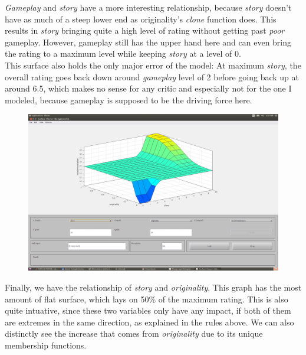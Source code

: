 \documentclass[a4paper, 11pt]{article}
\begin{document}
\textit{Gameplay} and \textit{story} have a more interesting relationship, because \textit{story} doesn't have as much of a steep lower end as originality's \textit{clone} function does. This results in \textit{story} bringing quite a high level of rating without getting past \textit{poor} gameplay. However, gameplay still has the upper hand here and can even bring the rating to a maximum level while keeping \textit{story} at a level of 0.\\ This surface also holds the only major error of the model: At maximum \textit{story}, the overall rating goes back down around \textit{gameplay} level of 2 before going back up at around 6.5, which makes no sense for any critic and especially not for the one I modeled, because gameplay is supposed to be the driving force here.

\newpage

\begin{figure}[ht]
\includegraphics[scale=0.15]{vg-surface-s-o.jpg}
\end{figure}

Finally, we have the relationship of \textit{story} and \textit{originality}. This graph has the most amount of flat surface, which lays on 50\% of the maximum rating. This is also quite intuative, since these two variables only have any impact, if both of them are extremes in the same direction, as explained in the rules above. We can also distinctly see the increase that comes from \textit{originality} due to its unique membership functions.
\end{document}
